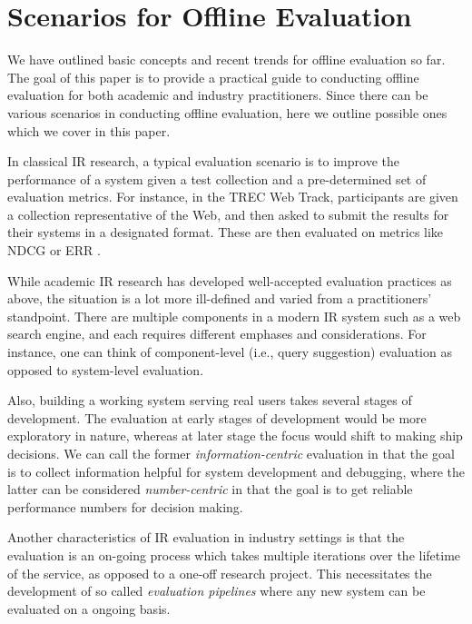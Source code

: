 
\section{Scenarios for Offline Evaluation}

We have outlined basic concepts and recent trends for offline evaluation so far. The goal of this paper is to provide a practical guide to conducting offline evaluation for both academic and industry practitioners. Since there can be various scenarios in conducting offline evaluation, here we outline possible ones which we cover in this paper.

In classical IR research, a typical evaluation scenario is to improve the performance of a system given a test collection and a pre-determined set of evaluation metrics. For instance, in the TREC Web Track, participants are given a collection representative of the Web, and then asked to submit the results for their systems in a designated format. These are then evaluated on metrics like NDCG \citep{Jarvelin:2002} or ERR \citep{ChapelleMZG09}.

While academic IR research has developed well-accepted evaluation practices as above, the situation is a lot more ill-defined and varied from a practitioners' standpoint. There are multiple components in a modern IR system such as a web search engine, and each requires different emphases and considerations. For instance, one can think of component-level (i.e., query suggestion) evaluation as opposed to system-level evaluation. 

Also, building a working system serving real users takes several stages of development. The evaluation at early stages of development would be more exploratory in nature, whereas at later stage the focus would shift to making ship decisions. We can call the former \textit{information-centric} evaluation in that the goal is to collect information helpful for system development and debugging, where the latter can be considered \textit{number-centric} in that the goal is to get reliable performance numbers for decision making.

Another characteristics of IR evaluation in industry settings is that the evaluation is an on-going process which takes multiple iterations over the lifetime of the service, as opposed to a one-off research project. This necessitates the development of so called \textit{evaluation pipelines} where any new system can be evaluated on a ongoing basis.

